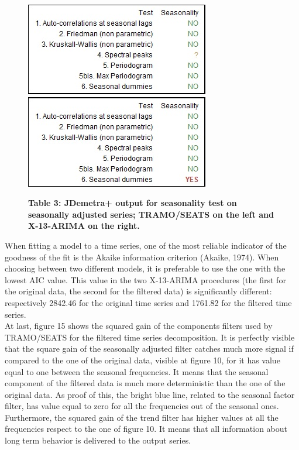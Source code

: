 \documentclass{article}
\begin{document}
\begin{figure}[H]
  \begin{minipage}[b]{0.5\textwidth}
    \includegraphics[width=\textwidth]{../images/capitolo4/testTS.jpg}
  \end{minipage}
  \hfill
  \begin{minipage}[b]{0.5\textwidth}
    \includegraphics[width=\textwidth]{../images/capitolo4/testX13.jpg}
  \end{minipage}
  {\textbf{\scriptsize Table 3: JDemetra+ output for seasonality test on seasonally adjusted series; TRAMO/SEATS on the left and X-13-ARIMA on the right.}}
\end{figure}
When fitting a model to a time series, one of the most reliable indicator of the goodness of the fit is the Akaike information criterion (Akaike, 1974). When choosing between two different models, it is preferable to use the one with the lowest AIC value. This value in the two X-13-ARIMA procedures (the first for the original data, the second for the filtered data) is significantly different: respectively 2842.46 for the original time series and 1761.82 for the filtered time series.\\At last, figure 15 shows the squared gain of the components filters used by TRAMO/SEATS for the filtered time series decomposition. It is perfectly visible that the square gain of the seasonally adjusted filter catches much more signal if compared to the one of the original data, visible at figure 10, for it has value equal to one between the seasonal frequencies. It means that the seasonal component of the filtered data is much more deterministic than the one of the original data. As proof of this, the bright blue line, related to the seasonal factor filter, has value equal to zero for all the frequencies out of the seasonal ones. Furthermore, the squared gain of the trend filter has higher values at all the frequencies respect to the one of figure 10. It means that all information about long term behavior is delivered to the output series.
\end{document}
